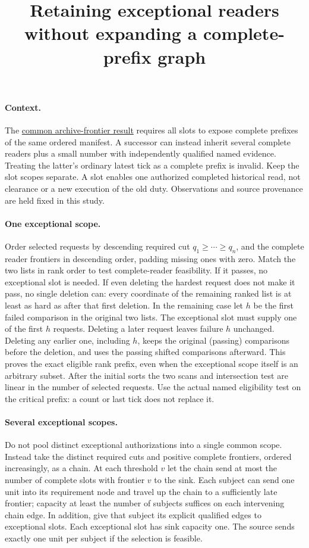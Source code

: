 \documentclass[11pt]{article}
\title{Retaining exceptional readers without expanding a complete-prefix graph}
\author{}\date{}
\begin{document}
\maketitle

\paragraph{Context.}
The
\href{https://github.com/eternal-november/eos-research-programmes/pull/692}
{common archive-frontier result} requires all slots to expose complete
prefixes of the same ordered manifest. A successor can instead inherit
several complete readers plus a small number with independently
qualified named evidence. Treating the latter's ordinary latest tick
as a complete prefix is invalid. Keep the slot scopes separate.
A slot enables one authorized completed historical read, not clearance
or a new execution of the old duty. Observations and source provenance
are held fixed in this study.

\paragraph{One exceptional scope.}
Order selected requests by descending required cut \(q_1\ge \cdots
\ge q_n\), and the complete reader frontiers in descending order,
padding missing ones with zero. Match the two lists in rank order
to test complete-reader feasibility. If it passes, no exceptional
slot is needed. If even deleting the hardest request does not make
it pass, no single deletion can: every coordinate of the remaining
ranked list is at least as hard as after that first deletion.
In the remaining case let \(h\) be the first failed comparison in
the original two lists. The exceptional slot must supply one of the
first \(h\) requests. Deleting a later request leaves failure \(h\)
unchanged. Deleting any earlier one, including \(h\), keeps the
original (passing) comparisons before the deletion, and uses the
passing shifted comparisons afterward. This proves the exact
eligible rank prefix, even when the exceptional scope itself is an
arbitrary subset. After the initial sorts the two scans and intersection
test are linear in the number of selected requests. Use the actual
named eligibility test on the critical prefix: a count or last tick
does not replace it.

\paragraph{Several exceptional scopes.}
Do not pool distinct exceptional authorizations into a single common
scope. Instead take the distinct required cuts and positive complete
frontiers, ordered increasingly, as a chain. At each threshold \(v\)
let the chain send at most the number of complete slots with
frontier \(v\) to the sink. Each subject can send one unit into
its requirement node and travel up the chain to a sufficiently
late frontier; capacity at least the number of subjects suffices
on each intervening chain edge. In addition, give that subject
its explicit qualified edges to exceptional slots. Each exceptional
slot has sink capacity one. The source sends exactly one unit per
subject if the selection is feasible.
\end{document}
